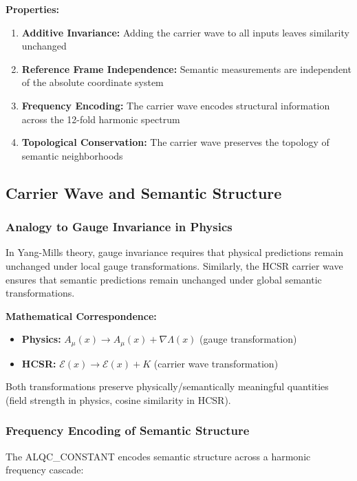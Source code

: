 \documentclass[11pt, letterpaper]{article}
\begin{document}
\textbf{Properties:}
\begin{enumerate}
    \item \textbf{Additive Invariance:} Adding the carrier wave to all inputs leaves similarity unchanged
    \item \textbf{Reference Frame Independence:} Semantic measurements are independent of the absolute coordinate system
    \item \textbf{Frequency Encoding:} The carrier wave encodes structural information across the 12-fold harmonic spectrum
    \item \textbf{Topological Conservation:} The carrier wave preserves the topology of semantic neighborhoods
\end{enumerate}

\subsection{Carrier Wave and Semantic Structure}

\subsubsection{Analogy to Gauge Invariance in Physics}

In Yang-Mills theory, gauge invariance requires that physical predictions remain unchanged under local gauge transformations. Similarly, the HCSR carrier wave ensures that semantic predictions remain unchanged under global semantic transformations.

\textbf{Mathematical Correspondence:}
\begin{itemize}
    \item \textbf{Physics:} $A_\mu(x) \rightarrow A_\mu(x) + \nabla \Lambda(x)$ (gauge transformation)
    \item \textbf{HCSR:} $\mathcal{E}(x) \rightarrow \mathcal{E}(x) + K$ (carrier wave transformation)
\end{itemize}

Both transformations preserve physically/semantically meaningful quantities (field strength in physics, cosine similarity in HCSR).

\subsubsection{Frequency Encoding of Semantic Structure}

The ALQC\_CONSTANT encodes semantic structure across a harmonic frequency cascade:
\end{document}
